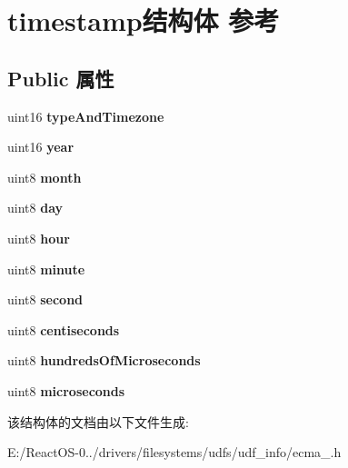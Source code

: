 \hypertarget{structtimestamp}{}\section{timestamp结构体 参考}
\label{structtimestamp}
\subsection*{Public 属性}
\begin{DoxyCompactItemize}
\item 
\mbox{\label{structtimestamp_ac3177b9a59e217dde0bd2311b2029fd9}} 
uint16 {\bfseries type\+And\+Timezone}
\item 
\mbox{\label{structtimestamp_abccd8aa8399eb9efc036fb5bad9e2a67}} 
uint16 {\bfseries year}
\item 
\mbox{\label{structtimestamp_ac104afcbbb84f7bf5d55592410069187}} 
uint8 {\bfseries month}
\item 
\mbox{\label{structtimestamp_a64100dab1ea5cac93fc5b7faec08b736}} 
uint8 {\bfseries day}
\item 
\mbox{\label{structtimestamp_a19f715351c98d3f47b56f410be78c4a1}} 
uint8 {\bfseries hour}
\item 
\mbox{\label{structtimestamp_ab0d2f59d20ff87da6a0cf6537f2957ab}} 
uint8 {\bfseries minute}
\item 
\mbox{\label{structtimestamp_ae23158e6b0debe953967fbe6b6801c4f}} 
uint8 {\bfseries second}
\item 
\mbox{\label{structtimestamp_abd169863556bf774b413534f2065c0d8}} 
uint8 {\bfseries centiseconds}
\item 
\mbox{\label{structtimestamp_a3f49c412d88a704d4c65f4d15ac5ac06}} 
uint8 {\bfseries hundreds\+Of\+Microseconds}
\item 
\mbox{\label{structtimestamp_a3d695d151cb7a87df870a15b02438ccc}} 
uint8 {\bfseries microseconds}
\end{DoxyCompactItemize}


该结构体的文档由以下文件生成\+:\begin{DoxyCompactItemize}
\item 
E\+:/\+React\+O\+S-\/0../drivers/filesystems/udfs/udf\+\_\+info/ecma\+\_.\+h\end{DoxyCompactItemize}
